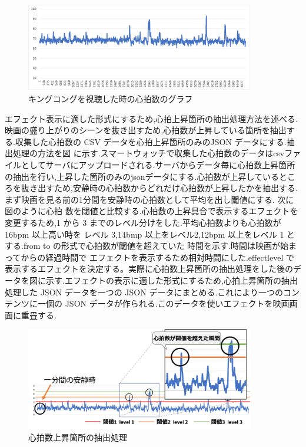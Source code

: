 \begin{figure}[H]
    \centering
    \includegraphics[width=10cm]{images/chapter3/gurafu3.png}
    \caption{キングコングを視聴した時の心拍数のグラフ}
\end{figure}

エフェクト表示に適した形式にするため,心拍上昇箇所の抽出処理方法を述べる.映画の盛り上がりのシーンを抜き出すため,心拍数が上昇している箇所を抽出する.収集した心拍数の CSV データを心拍上昇箇所のみのJSON データにする.抽出処理の方法を図 に示す.スマートウォッチで収集した心拍数のデータはcsvファイルとしてサーバにアップロードされる.サーバからデータ毎に心拍数上昇箇所の抽出を行い,上昇した箇所のみのjsonデータにする.心拍数が上昇しているところを抜き出すため,安静時の心拍数からどれだけ心拍数が上昇したかを抽出する.まず映画を見る前の1分間を安静時の心拍数として平均を出し閾値にする. 次に図のように心拍 数を閾値と比較する.心拍数の上昇具合で表示するエフェクトを変更するため,1 から 3 までのレベル分けをした.平均心拍数よりも心拍数が 16bpm 以上高い時を レベル 3,14bmp 以上をレベル2,12bpm 以上をレベル 1 とする.from to の形式で心拍数が閾値を超えていた 時間を示す.時間は映画が始まってからの経過時間で エフェクトを表示するため相対時間にした.effectlevel で表示するエフェクトを決定する。実際に心拍数上昇箇所の抽出処理をした後のデータを図に示す.エフェクトの表示に適した形式にするため,心拍上昇箇所の抽出処理した JSON データを一つの JSON データにまとめる.これにより一つのコンテンツに一個の JSON データが作られる.このデータを使いエフェクトを映画画面に重畳する.

\begin{figure}[H]
    \centering
    \includegraphics[width=10cm]{images/chapter3/haisyutusyori.png}
    \caption{心拍数上昇箇所の抽出処理}
\end{figure}

